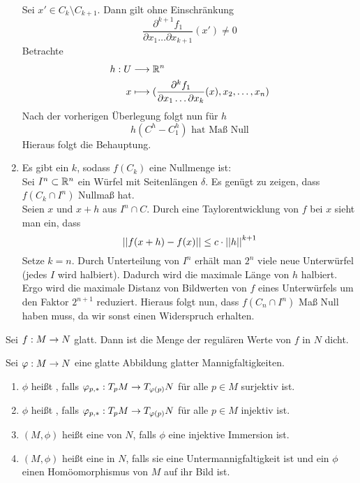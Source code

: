 \begin{Beweis}{}
\begin{enumerate}[(1)]
	Sei $x' \in C_k\setminus C_{k+1}$. Dann gilt ohne Einschränkung
	\[ \frac{\partial^{k+1} f_1}{\partial x_1\ldots \partial x_{k+1}}(x') \neq  0 \]
	Betrachte
	\begin{align*}
	h : U & \overset{}{\longrightarrow} \mathbb{R}^n\\
	x & \longmapsto (\frac{\partial^{k} f_1}{\partial x_1\ldots \partial x_{k}}(x), x_2, \ldots, x_n)
	\end{align*}
	Nach der vorherigen Überlegung folgt nun für $h$
	\[ h(C^h - C_1^h) \text{ hat Maß Null} \]
	Hieraus folgt die Behauptung.
	\item Es gibt ein $k$, sodass $f(C_k)$ eine Nullmenge ist:\\
	Sei $I^n \subset \mathbb{R}^n$ ein Würfel mit Seitenlängen $\delta$. Es genügt zu zeigen, dass $f(C_k \cap I^n)$ Nullmaß hat.\\
	Seien $x$ und $x+h$ aus $I^n \cap C$. Durch eine Taylorentwicklung von $f$ bei $x$ sieht man ein, dass
	\[ \left|\left|f(x+h) - f(x)\right|\right| \leq c \cdot \left|\left|h\right|\right|^{k+1} \]
	Setze $k = n$. Durch Unterteilung von $I^n$ erhält man $2^n$ viele neue Unterwürfel (jedes $I$ wird halbiert). Dadurch wird die maximale Länge von $h$ halbiert. Ergo wird die maximale Distanz von Bildwerten von $f$ eines Unterwürfels um den Faktor $2^{n+1}$ reduziert. Hieraus folgt nun, dass $f(C_n\cap I^n)$ Maß Null haben muss, da wir sonst einen Widerspruch erhalten.
\end{enumerate}
\end{Beweis}

Sei $f : M \overset{}{\rightarrow} N$ glatt. Dann ist die Menge der regulären Werte von $f$ in $N$ dicht.

\Def{}
Sei $\varphi : M \overset{}{\rightarrow} N$ eine glatte Abbildung glatter Mannigfaltigkeiten.
\begin{enumerate}[1.)]
	\item $\phi$ heißt , falls $\varphi_{p,*} : T_pM \overset{}{\rightarrow} T_{\varphi(p)}N $ für alle $p \in M$ surjektiv ist.
	\item $\phi$ heißt , falls $\varphi_{p,*} : T_pM \overset{}{\rightarrow} T_{\varphi(p)}N $ für alle $p \in M$ injektiv ist.
	\item $(M,\phi)$ heißt eine  von $N$, falls $\phi$ eine injektive Immersion ist.
	\item $(M,\phi)$ heißt eine  in $N$, falls sie eine Untermannigfaltigkeit ist und ein $\phi$ einen Homöomorphismus von $M$ auf ihr Bild ist.
\end{enumerate}

